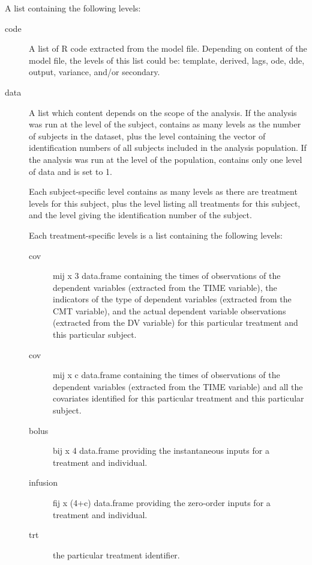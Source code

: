 \begin{Arguments}
\begin{ldescription}
\item[\code{problem}] A list containing the following levels:\begin{description}

\item[code] A list of R code extracted from the model file. Depending on 
content of the model file, the levels of this list could be: template,
derived, lags, ode, dde, output, variance, and/or secondary.
\item[data] A list which content depends on the scope of the analysis. If 
the analysis was run at the level of the subject,  contains as 
many levels as the number of subjects in the dataset, plus the 
level containing the vector of identification numbers of all subjects 
included in the analysis population. If the analysis was run at the level 
of the population,  contains only one level of data and 
 is set to 1.

Each subject-specific level contains as many levels as there are treatment
levels for this subject, plus the  level listing all treatments
for this subject, and the  level giving the identification number
of the subject. 

Each treatment-specific levels is a list containing the following levels: 
\begin{description}

\item[cov] mij x 3 data.frame containing the times of observations of the
dependent variables (extracted from the TIME variable), the indicators
of the type of dependent variables (extracted from the CMT variable),
and the actual dependent variable observations (extracted from the 
DV variable) for this particular treatment and this particular 
subject.
\item[cov] mij x c data.frame containing the times of observations of 
the dependent variables (extracted from the TIME variable) and all the
covariates identified for this particular treatment and this 
particular subject.
\item[bolus] bij x 4 data.frame providing the instantaneous inputs 
for a treatment and individual.
\item[infusion] fij x (4+c) data.frame providing the zero-order inputs for
a treatment and individual.
\item[trt] the particular treatment identifier.
\end{description}



\end{description}
\end{ldescription}
\end{Arguments}
